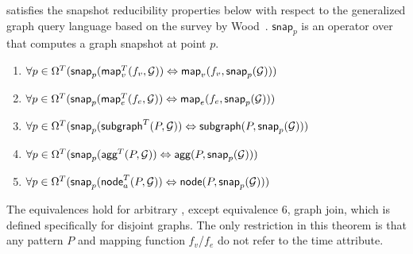 \begin{theorem}
\label{theo:reduce}
\tga satisfies the snapshot reducibility properties below with respect
to the generalized graph query language based on the survey by
Wood~\cite{Wood2012}.  $\textsf{snap}_p$ is an operator over \tgs that
computes a graph snapshot at point $p$.

\begin{enumerate}[itemindent=\dimexpr\labelwidth+\labelsep\relax,leftmargin=5pt]
\item $\forall p \in \Omega^T (\textsf{snap}_p(\textsf{map}^T_v(f_v,\mathcal{G})) \Leftrightarrow \textsf{map}_v(f_v,\textsf{snap}_p(\mathcal{G})))$

\item $\forall p \in \Omega^T (\textsf{snap}_p(\textsf{map}^T_e(f_e,\mathcal{G})) \Leftrightarrow \textsf{map}_e(f_e,\textsf{snap}_p(\mathcal{G})))$

\item $\forall p \in \Omega^T (\textsf{snap}_p(\textsf{subgraph}^T(P,\mathcal{G})) \Leftrightarrow \textsf{subgraph}(P,\textsf{snap}_p(\mathcal{G})))$

\item $\forall p \in \Omega^T (\textsf{snap}_p(\textsf{agg}^T(P,\mathcal{G})) \Leftrightarrow \textsf{agg}(P,\textsf{snap}_p(\mathcal{G})))$

\item $\forall p \in \Omega^T (\textsf{snap}_p(\textsf{node}^T_a(P,\mathcal{G})) \Leftrightarrow \textsf{node}(P,\textsf{snap}_p(\mathcal{G})))$


\end{enumerate}

The equivalences hold for arbitrary \tgs, except equivalence 6, graph
join, which is defined specifically for disjoint graphs.  The only
restriction in this theorem is that any pattern $P$ and mapping
function $f_v$/$f_e$ do not refer to the time attribute.
\end{theorem}

